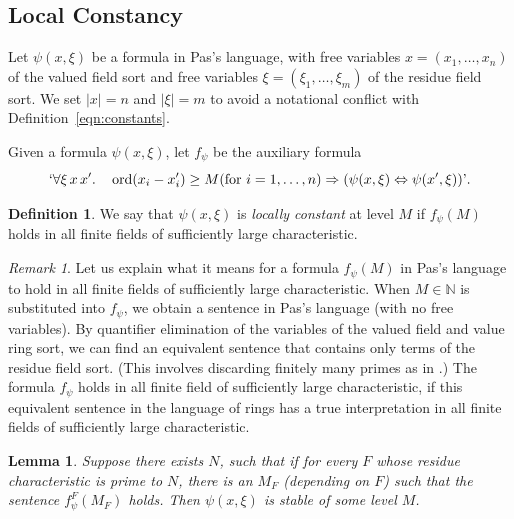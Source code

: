 \documentclass[11pt]{amsart}
\newtheorem{lemma}[theorem]{Lemma}
\theoremstyle{definition}
\newtheorem{definition}[theorem]{Definition}
\theoremstyle{remark}
\newtheorem{remark}[theorem]{Remark}
\numberwithin{equation}{theorem}
\newcommand{\ring}[1]{\mathbb{#1}}
\def\op#1{\operatorname{#1}}
\def\rq{\text{'}}
\begin{document}
\subsection{Local Constancy}\label{sec:stability}

Let $\psi(x,\xi)$ be a formula in Pas's language, with free
variables $x=(x_1,\ldots,x_n)$ of the valued field sort and free
variables $\xi=(\xi_1,\ldots,\xi_m)$ of the residue field sort. We
set $|x|=n$ and $|\xi|=m$ to avoid a notational conflict with
Definition~\ref{eqn:constants}.

Given a formula $\psi(x,\xi)$, let $f_\psi$ be the auxiliary
formula
   \begin{equation}
   `\forall \xi\, x\, x'.\quad
   \op{ord} (x_i-x'_i)\ge M (\text{for }i=1,\ldots,n)
   \Rightarrow (\psi(x,\xi) \Leftrightarrow \psi(x',\xi))\rq.
   \end{equation}

\begin{definition}\label{def:loc-const}
We say that $\psi(x,\xi)$ is {\it locally constant} at level $M$
if $f_\psi(M)$ holds in all finite fields of sufficiently large
characteristic.
\end{definition}

\begin{remark}\label{remark:large-char}
Let us explain what it means for a formula $f_\psi(M)$ in Pas's
language to hold in all finite fields of sufficiently large
characteristic. When $M\in\ring{N}$ is substituted into $f_\psi$,
we obtain a sentence in Pas's language (with no free variables).
By quantifier elimination of the variables of the valued field and
value ring sort, we can find an equivalent sentence that contains
only terms of the residue field sort. (This involves discarding
finitely many primes as in \cite{HOI}.)  The formula $f_\psi$
holds in all finite field of sufficiently large characteristic, if
this equivalent sentence in the language of rings has a true
interpretation in all finite fields of sufficiently large
characteristic.
\end{remark}

\begin{lemma}\label{lemma:stable}
Suppose there exists $N$, such that if for every
$F$ whose residue characteristic is prime to $N$, there is an
$M_F$ (depending on $F$) such that the sentence $f_\psi^F(M_F)$
holds. Then $\psi(x,\xi)$ is stable of some level $M$.
\end{lemma}
\end{document}
